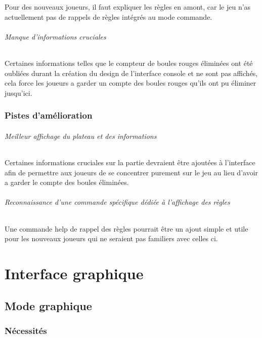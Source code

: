 \documentclass{scrreprt}
\begin{document}
			Pour des nouveaux joueurs, il faut expliquer les règles en amont, car le jeu n'as actuellement pas de rappels de règles intégrés au mode commande.
			
			\paragraph{Manque d'informations cruciales}
			
			Certaines informations telles que le compteur de boules rouges éliminées ont été oubliées durant la création du design de l'interface console et ne sont pas affichés, cela force les joueurs a garder un compte des boules rouges qu'ils ont pu éliminer jusqu'ici. 
			
		\section{Pistes d'amélioration}
			
			\paragraph{Meilleur affichage du plateau et des informations} 
			
			Certaines informations cruciales sur la partie devraient être ajoutées à l'interface afin de permettre aux joueurs de se concentrer purement sur le jeu au lieu d'avoir a garder le compte des boules éliminées.
			
			\paragraph{Reconnaissance d'une commande spécifique dédiée à l'affichage des règles}
			
			Une commande help de rappel des règles pourrait être un ajout simple et utile pour les nouveaux joueurs qui ne seraient pas familiers avec celles ci. 

			
\part{Interface graphique}

	\chapter{Mode graphique}
		\section{Nécessités}
\end{document}
